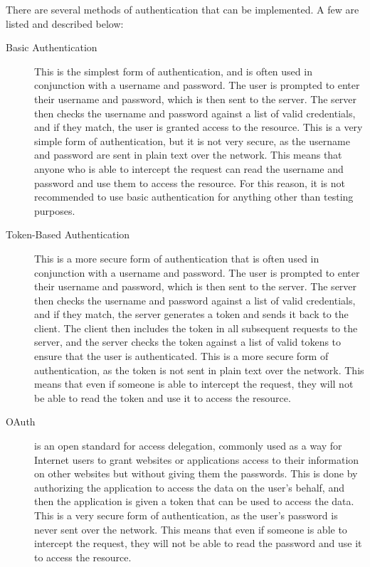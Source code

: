 \documentclass[11pt, a4paper,twoside]{report}
\theoremstyle{plain} %
\theoremstyle{definition} %
\numberwithin{equation}{chapter}
\begin{document}
There are several methods of authentication that can be implemented. A few are
listed and described below:

\begin{description}
    \item[Basic Authentication\cite{basic-authentication}] {
        This is the simplest form of authentication, and is often used in
        conjunction with a username and password. The user is prompted to enter
        their username and password, which is then sent to the server. The
        server then checks the username and password against a list of valid
        credentials, and if they match, the user is granted access to the
        resource. This is a very simple form of authentication, but it is not
        very secure, as the username and password are sent in plain text over
        the network. This means that anyone who is able to intercept the
        request can read the username and password and use them to access the
        resource. For this reason, it is not recommended to use basic
        authentication for anything other than testing purposes.
        }
    \item[Token-Based Authentication\cite{token-based-authentication}] {
        This is a more secure form of authentication that is often used in
        conjunction with a username and password. The user is prompted to enter
        their username and password, which is then sent to the server. The
        server then checks the username and password against a list of valid
        credentials, and if they match, the server generates a token and sends
        it back to the client. The client then includes the token in all
        subsequent requests to the server, and the server checks the token
        against a list of valid tokens to ensure that the user is
        authenticated. This is a more secure form of authentication, as the
        token is not sent in plain text over the network. This means that even
        if someone is able to intercept the request, they will not be able to
        read the token and use it to access the resource.
        }
    \item[OAuth\cite{oauth}] {
        is an open standard for access delegation, commonly used as a way
        for Internet users to grant websites or applications access to their
        information on other websites but without giving them the passwords.
        This is done by authorizing the application to access the data on the
        user's behalf, and then the application is given a token that can be
        used to access the data. This is a very secure form of authentication,
        as the user's password is never sent over the network. This means that
        even if someone is able to intercept the request, they will not be able
        to read the password and use it to access the resource.
        }
\end{description}
\end{document}
